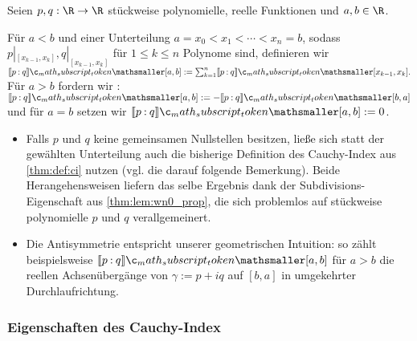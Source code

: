 \documentclass{mythesis}
\begin{document}
\begin{definition} \label{thm:def:ci_pwpoly}
    Seien $p, q: \R \to \R$ stückweise polynomielle, reelle Funktionen und $a, b \in \nobreak \R$.

    Für $a < b$ und einer Unterteilung $a = x_0 < x_1 < \dotsb < x_n = b$, sodass $p|_{[x_{k-1}, x_k]}, q|_{[x_{k-1}, x_k]}$ für $1 \le k \le n$ Polynome sind, definieren wir
    \begin{math}
        \Index{[a,b]}{p}{q}
        := \sum_{k=1}^n \Index{[x_{k-1}, x_k]}{p}{q}.
    \end{math}
    Für $a > b$ fordern wir : $\Index{[a,b]}{p}{q} := -\Index{[b,a]}{p}{q}$ und für $a = b$ setzen wir $\Index{[a,b]}{p}{q} := 0$.
    \begin{note}
        \begin{itemize}
            \item
                Falls $p$ und $q$ keine gemeinsamen Nullstellen besitzen, ließe sich statt der gewählten Unterteilung auch die bisherige Definition des Cauchy-Index aus \ref{thm:def:ci} nutzen (vgl. die darauf folgende Bemerkung).
                Beide Herangehensweisen liefern das selbe Ergebnis dank der Subdivisions-Eigenschaft aus \ref{thm:lem:wn0_prop}, die sich problemlos auf stückweise polynomielle $p$ und $q$ verallgemeinert.
            \item
                Die Antisymmetrie entspricht unserer geometrischen Intuition: so zählt beispielsweise $\Index{[a,b]}{p}{q}$ für $a > b$ die reellen Achsenübergänge von $\gamma := p + iq$ auf $[b, a]$ in umgekehrter Durchlaufrichtung.
        \end{itemize}
    \end{note}
\end{definition}


%
%



\subsubsection{Eigenschaften des Cauchy-Index}
\end{document}
